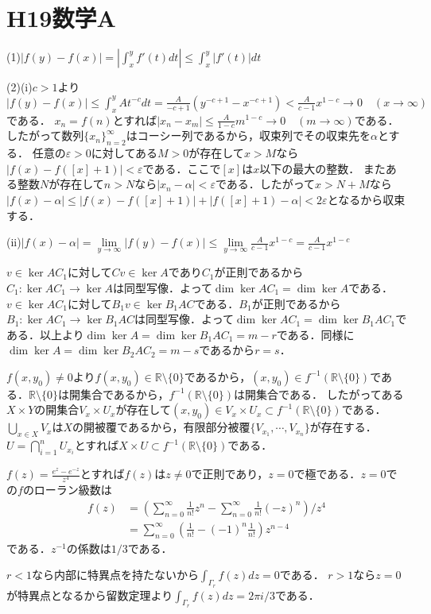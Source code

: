 \documentclass[
		book,
		head_space=20mm,
		foot_space=20mm,
		gutter=10mm,
		line_length=190mm
]{jlreq}
\begin{document}
\section{H19数学A}
(1)$|f(y)-f(x)|=|\int_x^yf'(t)dt|\le\int_x^y|f'(t)|dt$

(2)(i)$c>1$より
$|f(y)-f(x)|\le\int_x^y At^{-c}dt=\frac{A}{-c+1}(y^{-c+1}-x^{-c+1})<\frac{A}{c-1}x^{1-c}\rightarrow 0\quad(x \rightarrow \infty)$である．
$x_n=f(n)$とすれば$|x_n-x_m|\le\frac{A}{1-c}m^{1-c}\rightarrow0\quad(m\rightarrow \infty)$である．したがって数列$\{x_n\}_{n=2}^{\infty}$はコーシー列であるから，収束列でその収束先を$\alpha$とする．
任意の$\varepsilon>0$に対してある$M>0$が存在して$x>M$なら$|f(x)-f([x]+1)|<\varepsilon$である．ここで$[x]$は$x$以下の最大の整数．
またある整数$N$が存在して$n>N$なら$|x_n-\alpha|<\varepsilon$である．したがって$x>N+M$なら$|f(x)-\alpha|\le|f(x)-f([x]+1)|+|f([x]+1)-\alpha|<2\varepsilon$となるから収束する．

(ii)$|f(x)-\alpha|=\lim\limits_{y\to \infty}|f(y)-f(x)|\le\lim\limits_{y\to \infty}\frac{A}{c-1}x^{1-c}=\frac{A}{c-1}x^{1-c}$

$v\in\ker AC_1$に対して$Cv\in \ker A$であり$C_1$が正則であるから$C_1 \colon \ker AC_1 \rightarrow\ker A$は同型写像．よって$\dim \ker AC_1=\dim \ker A$である．
$v \in \ker AC_1$に対して$B_1v \in \ker B_1AC$である．$B_1$が正則であるから$B_1 \colon \ker AC_1 \rightarrow \ker B_1AC$は同型写像．よって$\dim \ker AC_1=\dim \ker B_1AC_1$である．以上より$\dim \ker A=\dim \ker B_1AC_1=m-r$である．同様に$\dim \ker A = \dim \ker B_2AC_2=m-s$であるから$r=s$．

$f(x,y_0)\neq 0$より$f(x,y_0)\in \mathbb{R}\setminus\{ 0\}$であるから，$(x,y_0)\in f^{-1}(\mathbb{R}\setminus\{ 0\})$である．$\mathbb{R}\setminus\{0\}$は開集合であるから，$f^{-1}(\mathbb{R}\setminus\{ 0\})$は開集合である．
したがってある$X\times Y$の開集合$V_x\times U_x$が存在して$(x,y_0)\in V_x\times U_x\subset f^{-1}(\mathbb{R}\setminus\{ 0\})$である．$\bigcup\limits_{x\in X}V_x$は$X$の開被覆であるから，有限部分被覆$\{V_{x_1},\cdots,V_{x_n}\}$が存在する．$U=\bigcap\limits_{i=1}^nU_{x_i}$とすれば$X\times U\subset f^{-1}(\mathbb{R}\setminus\{ 0\})$である．

$f(z)=\frac{e^z-e^{-z}}{z^4}$とすれば$f(z)$は$z\neq 0$で正則であり，$z=0$で極である．$z=0$での$f$のローラン級数は
\begin{align}
	f(z)&= (\sum_{n=0}^{\infty}\frac{1}{n!}z^n-\sum_{n=0}^{\infty}\frac{1}{n!}(-z)^n)/z^4\\
	&=\sum_{n=0}^{\infty}(\frac{1}{n!}-(-1)^n\frac{1}{n!})z^{n-4}
\end{align}である．$z^{-1}$の係数は$1/3$である．

$r<1$なら内部に特異点を持たないから$\int_{\Gamma_r}f(z)dz=0$である．
$r>1$なら$z=0$が特異点となるから留数定理より$\int_{\Gamma_r}f(z)dz=2\pi i/3$である．
\end{document}
